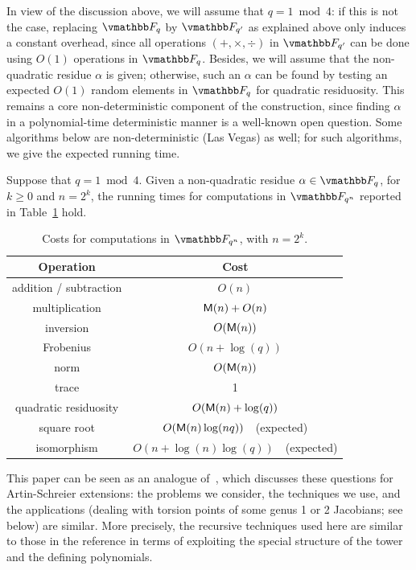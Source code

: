 In view of the discussion above, we will assume that $q = 1 \bmod 4$:
if this is not the case, replacing $\F_q$ by $\F_{q'}$ as explained
above only induces a constant overhead, since all operations
$(+,\times,\div)$ in $\F_{q'}$ can be done using $O(1)$ operations in
$\F_q$. Besides, we will assume that the non-quadratic residue
$\alpha$ is given; otherwise, such an $\alpha$ can be found by
testing an expected $O(1)$ random elements in $\F_q$ for quadratic
residuosity. This remains a core non-deterministic component of the
construction, since finding $\alpha$ in a polynomial-time
deterministic manner is a well-known open question. Some algorithms
below are non-deterministic (Las Vegas) as well; for such algorithms,
we give the expected running time.

\begin{theorem}\label{theo:main}
  Suppose that $q=1 \bmod 4$. Given a non-quadratic residue $\alpha
  \in \F_q$, for $k \ge 0$ and $n=2^k$, the running times for
  computations in $\F_{q^n}$ reported in Table~\ref{tab1} hold.
\end{theorem}

\begin{table}[h]
\begin{center}
\begin{tabular}{c|c}
Operation & Cost \\
\hline
addition / subtraction & $O(n)$\\
multiplication & $\mathsf{M}(n)+O(n)$\\
inversion & $O(\mathsf{M}(n))$\\
Frobenius & $O(n+\log(q))$\\
norm & $O(\mathsf{M}(n))$ \\
trace & 1 \\ 
quadratic residuosity & $O(\mathsf{M}(n)+\log(q))$ \\
square root &  $O(\mathsf{M}(n)\log(nq))$\ \ (expected) \\
isomorphism &  $O(n + \log(n)\log(q))$\ \ (expected)
\end{tabular}
  \caption{Costs for computations in $\F_{q^n}$, with $n=2^k$.}
  \label{tab1}
\end{center}
\end{table}

This paper can be seen as an
analogue of~\cite{DeSc12}, which discusses these questions for
Artin-Schreier extensions: the problems we consider, the techniques we
use, and the applications (dealing with torsion points of some genus 1
or 2 Jacobians; see below) are similar. More precisely, the recursive 
techniques used here are similar to those in the reference in terms of 
exploiting the special structure of the tower and the defining polynomials.

